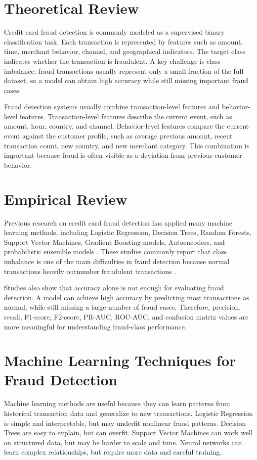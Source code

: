 \documentclass[12pt,a4paper]{report}
\begin{document}
\section{Theoretical Review}
Credit card fraud detection is commonly modeled as a supervised binary classification task. Each transaction is represented by features such as amount, time, merchant behavior, channel, and geographical indicators. The target class indicates whether the transaction is fraudulent. A key challenge is class imbalance: fraud transactions usually represent only a small fraction of the full dataset, so a model can obtain high accuracy while still missing important fraud cases.

Fraud detection systems usually combine transaction-level features and behavior-level features. Transaction-level features describe the current event, such as amount, hour, country, and channel. Behavior-level features compare the current event against the customer profile, such as average previous amount, recent transaction count, new country, and new merchant category. This combination is important because fraud is often visible as a deviation from previous customer behavior.

\section{Empirical Review}
Previous research on credit card fraud detection has applied many machine learning methods, including Logistic Regression, Decision Trees, Random Forests, Support Vector Machines, Gradient Boosting models, Autoencoders, and probabilistic ensemble models \cite{he2022mlmethods,oza2019fraud,lin2021autoencoder}. These studies commonly report that class imbalance is one of the main difficulties in fraud detection because normal transactions heavily outnumber fraudulent transactions \cite{mallidi2021analysis,adesina2024creditcard}.

Studies also show that accuracy alone is not enough for evaluating fraud detection. A model can achieve high accuracy by predicting most transactions as normal, while still missing a large number of fraud cases. Therefore, precision, recall, F1-score, F2-score, PR-AUC, ROC-AUC, and confusion matrix values are more meaningful for understanding fraud-class performance.

\section{Machine Learning Techniques for Fraud Detection}
Machine learning methods are useful because they can learn patterns from historical transaction data and generalize to new transactions. Logistic Regression is simple and interpretable, but may underfit nonlinear fraud patterns. Decision Trees are easy to explain, but can overfit. Support Vector Machines can work well on structured data, but may be harder to scale and tune. Neural networks can learn complex relationships, but require more data and careful training.
\end{document}
